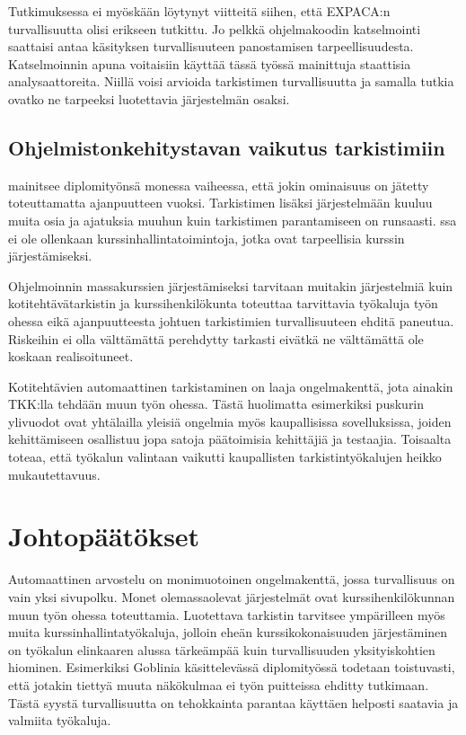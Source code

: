Tutkimuksessa ei myöskään löytynyt viitteitä siihen, että EXPACA:n
turvallisuutta olisi erikseen tutkittu. Jo pelkkä ohjelmakoodin katselmointi
saattaisi antaa käsityksen turvallisuuteen panostamisen tarpeellisuudesta.
Katselmoinnin apuna voitaisiin käyttää tässä työssä mainittuja staattisia
analysaattoreita. Niillä voisi arvioida tarkistimen turvallisuutta ja samalla
tutkia ovatko ne tarpeeksi luotettavia järjestelmän osaksi.

\subsection{Ohjelmistonkehitystavan vaikutus tarkistimiin}

\citet{Hiisila2005} mainitsee diplomityönsä monessa vaiheessa, että jokin
ominaisuus on jätetty toteuttamatta ajanpuutteen vuoksi. Tarkistimen lisäksi
järjestelmään kuuluu muita osia ja ajatuksia muuhun kuin tarkistimen
parantamiseen on runsaasti. {\scmrobo}ssa ei ole ollenkaan
kurssinhallintatoimintoja, jotka ovat tarpeellisia kurssin järjestämiseksi.

Ohjelmoinnin massakurssien järjestämiseksi tarvitaan muitakin järjestelmiä
kuin kotitehtävätarkistin ja kurssihenkilökunta toteuttaa tarvittavia
työkaluja työn ohessa eikä ajanpuutteesta johtuen tarkistimien turvallisuuteen
ehditä paneutua. Riskeihin ei olla välttämättä perehdytty tarkasti eivätkä
ne välttämättä ole koskaan realisoituneet.

Kotitehtävien automaattinen tarkistaminen on laaja ongelmakenttä, jota ainakin
TKK:lla tehdään muun työn ohessa. Tästä huolimatta esimerkiksi puskurin
ylivuodot ovat yhtälailla yleisiä ongelmia myös kaupallisissa sovelluksissa,
joiden kehittämiseen osallistuu jopa satoja päätoimisia kehittäjiä ja
testaajia. Toisaalta \citet{Hiisila2005} toteaa, että työkalun valintaan
vaikutti kaupallisten tarkistintyökalujen heikko mukautettavuus.  


\section{Johtopäätökset}
\label{sec:paketointi}

Automaattinen arvostelu on monimuotoinen ongelmakenttä, jossa turvallisuus
on vain yksi sivupolku. Monet olemassaolevat järjestelmät ovat
kurssihenkilökunnan muun työn ohessa toteuttamia. Luotettava tarkistin
tarvitsee ympärilleen myös muita kurssinhallintatyökaluja, jolloin
eheän kurssikokonaisuuden järjestäminen on työkalun elinkaaren alussa
tärkeämpää kuin turvallisuuden yksityiskohtien hiominen. Esimerkiksi
Goblinia käsittelevässä diplomityössä todetaan toistuvasti, että jotakin tiettyä
muuta näkökulmaa ei työn puitteissa ehditty tutkimaan. Tästä syystä
turvallisuutta on tehokkainta parantaa käyttäen helposti saatavia ja valmiita
työkaluja.

